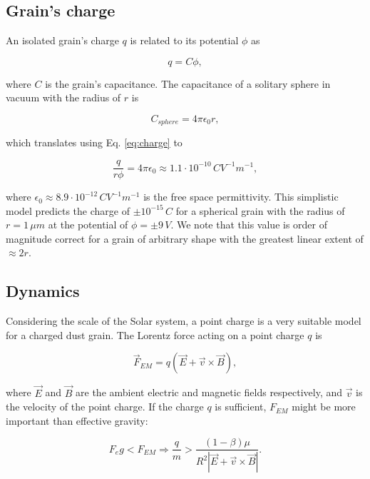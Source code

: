 \subsection{Grain's charge}

An isolated grain's charge $q$ is related to its potential $\phi$ as

\begin{equation}
    q = C \phi, \label{eq:charge}
\end{equation}

where $C$ is the grain's capacitance. The capacitance of a solitary sphere in vacuum with the radius of $r$ is 

\begin{equation}
    C_{sphere} = 4 \pi \epsilon_0 r,
\end{equation}

which translates using Eq. \ref{eq:charge} to

\begin{equation}
    \frac{q}{r \phi} = 4 \pi \epsilon_0 \approx 1.1 \cdot 10^{-10} \, \si{C V^{-1} m^{-1}},
    \label{eq:capacitance}
\end{equation}

where $\epsilon_0 \approx 8.9\cdot10^{-12} \, \si{C V^{-1} m^{-1}}$ is the free space permittivity. This simplistic model predicts the charge of $\pm 10^{-15} \, \si{C}$ for a spherical grain with the radius of $r = 1 \, \si{\mu m}$ at the potential of $\phi = \pm 9 \, \si{V}$. We note that this value is order of magnitude correct for a grain of arbitrary shape with the greatest linear extent of $\approx 2r$.

\subsection{Dynamics}

Considering the scale of the Solar system, a point charge is a very suitable model for a charged dust grain. The Lorentz force acting on a point charge $q$ is

\begin{equation}
\vec{F}_{EM} = q \left( \vec{E} + \vec{v} \times \vec{B} \right),
\end{equation}

where $\vec{E}$ and $\vec{B}$ are the ambient electric and magnetic fields respectively, and $\vec{v}$ is the velocity of the point charge. If the charge $q$ is sufficient, $F_{EM}$ might be more important than effective gravity:

\begin{equation}
    F_eg < F_{EM} \Rightarrow \frac{q}{m} > \frac{(1-\beta)\mu}{R^2 \left| \vec{E} + \vec{v} \times \vec{B} \right|}. \label{eq:lorentz_gravity}
\end{equation}

